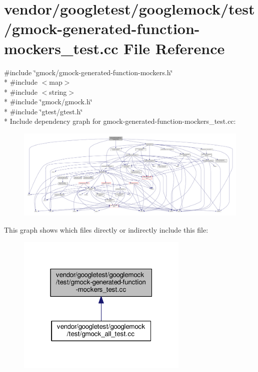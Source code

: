 \hypertarget{gmock-generated-function-mockers__test_8cc}{}\section{vendor/googletest/googlemock/test/gmock-\/generated-\/function-\/mockers\+\_\+test.cc File Reference}
\label{gmock-generated-function-mockers__test_8cc}
{\ttfamily \#include \char`\"{}gmock/gmock-\/generated-\/function-\/mockers.\+h\char`\"{}}\\*
{\ttfamily \#include $<$map$>$}\\*
{\ttfamily \#include $<$string$>$}\\*
{\ttfamily \#include \char`\"{}gmock/gmock.\+h\char`\"{}}\\*
{\ttfamily \#include \char`\"{}gtest/gtest.\+h\char`\"{}}\\*
Include dependency graph for gmock-\/generated-\/function-\/mockers\+\_\+test.cc\+:\nopagebreak
\begin{figure}[H]
\begin{center}
\leavevmode
\includegraphics[width=350pt]{gmock-generated-function-mockers__test_8cc__incl}
\end{center}
\end{figure}
This graph shows which files directly or indirectly include this file\+:\nopagebreak
\begin{figure}[H]
\begin{center}
\leavevmode
\includegraphics[width=232pt]{gmock-generated-function-mockers__test_8cc__dep__incl}
\end{center}
\end{figure}
